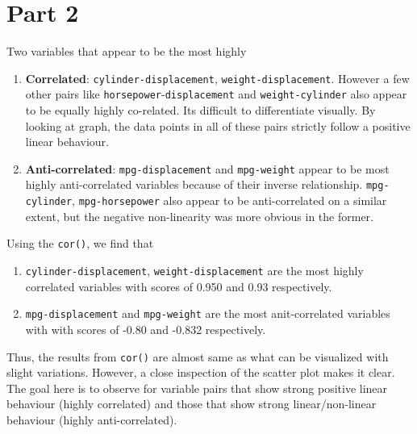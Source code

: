 \documentclass{article}[a4paper]
\begin{document}
\section*{Part 2}
Two variables that appear to be the most highly
\begin{enumerate}
    \item \textbf{Correlated}: \texttt{cylinder-displacement}, \texttt{weight-displacement}. However a few other pairs like \texttt{horsepower}-\texttt{displacement} and \texttt{weight-cylinder} also appear to be equally highly co-related. Its difficult to differentiate visually. By looking at graph, the data points in all of these pairs strictly follow a positive linear behaviour. 
    \item \textbf{Anti-correlated}: \texttt{mpg-displacement} and \texttt{mpg-weight} appear to be most highly anti-correlated variables because of their inverse relationship. \texttt{mpg-cylinder}, \texttt{mpg-horsepower} also appear to be anti-correlated on a similar extent, but the negative non-linearity was more obvious in the former.
\end{enumerate}
Using the \texttt{cor()}, we find that 
\begin{enumerate}
    \item \texttt{cylinder-displacement}, \texttt{weight-displacement} are the most highly correlated variables with scores of 0.950 and 0.93 respectively.
    \item \texttt{mpg-displacement} and \texttt{mpg-weight} are the most anit-correlated variables with with scores of -0.80 and -0.832 respectively.
\end{enumerate}
Thus, the results from \texttt{cor()} are almost same as what can be visualized with slight variations. However, a close inspection of the scatter plot makes it clear. The goal here is to observe for variable pairs that show strong positive linear behaviour (highly correlated) and those that show strong linear/non-linear behaviour (highly anti-correlated).
\end{document}
